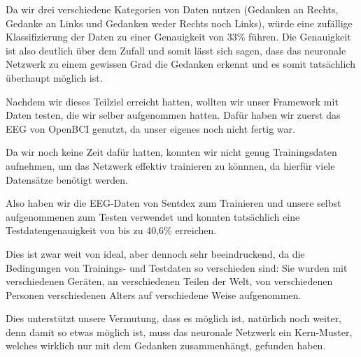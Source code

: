 \documentclass[10pt]{article}
\begin{document}
Da wir drei verschiedene Kategorien von Daten nutzen (Gedanken an Rechts, Gedanke an Links und Gedanken weder Rechts noch Links), würde eine zufällige Klassifizierung der Daten zu einer Genauigkeit von 33\% führen.
Die Genauigkeit ist also deutlich über dem Zufall und somit lässt sich sagen, dass das neuronale Netzwerk zu einem gewissen Grad die Gedanken erkennt und es somit tatsächlich überhaupt möglich ist.


Nachdem wir dieses Teilziel erreicht hatten, wollten wir unser Framework mit Daten testen, die wir selber aufgenommen hatten. 
Dafür haben wir zuerst das EEG von OpenBCI genutzt, da unser eigenes noch nicht fertig war.

Da wir noch keine Zeit dafür hatten, konnten wir nicht genug Trainingsdaten aufnehmen, um das Netzwerk effektiv trainieren zu könnnen, da hierfür viele Datensätze benötigt werden.

Also haben wir die EEG-Daten von Sentdex zum Trainieren und unsere selbst aufgenommenen zum Testen verwendet und konnten tatsächlich eine Testdatengenauigkeit von bis zu 40,6\% erreichen.

Dies ist zwar weit von ideal, aber dennoch sehr beeindruckend, da die Bedingungen von Trainings- und Testdaten so verschieden sind:
Sie wurden mit verschiedenen Geräten, an verschiedenen Teilen der Welt, von verschiedenen Personen verschiedenen Alters auf verschiedene Weise aufgenommen.

Dies unterstützt unsere Vermutung, dass es möglich ist, natürlich noch weiter, denn damit so etwas möglich ist, muss das neuronale Netzwerk ein Kern-Muster, welches wirklich nur mit dem Gedanken zusammenhängt, gefunden haben.
\end{document}
